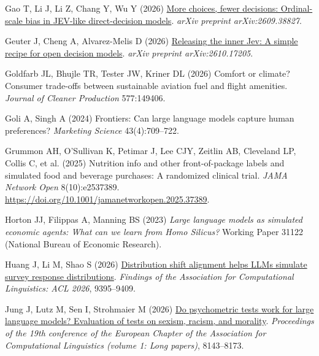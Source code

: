 \documentclass[
  11pt,
  letterpaper,
]{article}
\newlength{\cslhangindent}
\newenvironment{CSLReferences}[2] %
 {\begin{list}{}{%
  \setlength{\itemindent}{0pt}
  \setlength{\leftmargin}{0pt}
  \setlength{\parsep}{0pt}
  \ifodd #1
   \setlength{\leftmargin}{\cslhangindent}
   \setlength{\itemindent}{-1\cslhangindent}
  \fi
  \setlength{\itemsep}{#2\baselineskip}}}
 {\end{list}}
\begin{document}
\begin{CSLReferences}{1}{0}
Gao T, Li J, Li Z, Chang Y, Wu Y (2026)
\href{https://arxiv.org/abs/2609.38827}{More choices, fewer decisions:
Ordinal-scale bias in {JEV}-like direct-decision models}. \emph{arXiv
preprint arXiv:2609.38827}.

Geuter J, Cheng A, Alvarez-Melis D (2026)
\href{https://arxiv.org/abs/2610.17205}{Releasing the inner {Jev}: A
simple recipe for open decision models}. \emph{arXiv preprint
arXiv:2610.17205}.

Goldfarb JL, Bhujle TR, Tester JW, Kriner DL (2026) Comfort or climate?
Consumer trade-offs between sustainable aviation fuel and flight
amenities. \emph{Journal of Cleaner Production} 577:149406.

Goli A, Singh A (2024) Frontiers: Can large language models capture
human preferences? \emph{Marketing Science} 43(4):709--722.

Grummon AH, O'Sullivan K, Petimar J, Lee CJY, Zeitlin AB, Cleveland LP,
Collis C, et al. (2025) Nutrition info and other front-of-package labels
and simulated food and beverage purchases: A randomized clinical trial.
\emph{JAMA Network Open} 8(10):e2537389.
\url{https://doi.org/10.1001/jamanetworkopen.2025.37389}.

Horton JJ, Filippas A, Manning BS (2023) \emph{Large language models as
simulated economic agents: What can we learn from {Homo Silicus}?}
Working Paper 31122 (National Bureau of Economic Research).

Huang J, Li M, Shao S (2026)
\href{https://doi.org/10.18653/v1/2026.findings-acl.457}{Distribution
shift alignment helps {LLM}s simulate survey response distributions}.
\emph{Findings of the {A}ssociation for {C}omputational {L}inguistics:
{ACL} 2026}, 9395--9409.

Jung J, Lutz M, Sen I, Strohmaier M (2026)
\href{https://doi.org/10.18653/v1/2026.eacl-long.380}{Do psychometric
tests work for large language models? Evaluation of tests on sexism,
racism, and morality}. \emph{Proceedings of the 19th conference of the
{European Chapter of the Association for Computational Linguistics}
(volume 1: Long papers)}, 8143--8173.


\end{CSLReferences}
\end{document}
